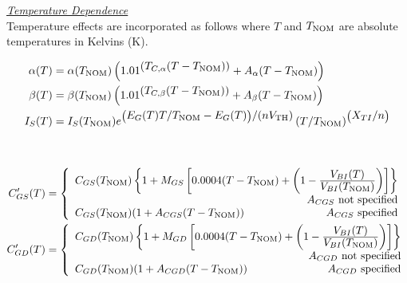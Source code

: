 \noindent\underline{\sl \large Temperature Dependence}
\\[0.1in]
Temperature effects are incorporated as follows where $T$ and $T_{\mbox{\scriptsize NOM}}$
are absolute temperatures in Kelvins (K).

\begin{align}
\alpha(T) & =  \alpha(T_{\mbox{\scriptsize NOM}}) \left(
                1.01^{\textstyle(T_{C,\alpha}(T-T_{\mbox{\scriptsize NOM}}))}
                + A_{\alpha}(T-T_{\mbox{\scriptsize NOM}}) \right)
                \\
\beta(T) & =  \beta(T_{\mbox{\scriptsize NOM}}) \left(
                1.01^{\textstyle(T_{C,\beta}(T-T_{\mbox{\scriptsize NOM}}))}
                + A_{\beta}(T-T_{\mbox{\scriptsize NOM}}) \right)
                \\
I_S (T) & =  I_S(T_{\mbox{\scriptsize NOM}})
        e^{\left( \textstyle E_G(T) {T / {T_{\mbox{\scriptsize NOM}}}}
            - E_G(T) \right) {\textstyle /(nV_{\mbox{\scriptsize TH}})}}
    \left({{\textstyle T} / {\textstyle T_{\mbox{\scriptsize NOM}}}}
    \right)^{ \left( \textstyle X_{TI}/n \right) }
\end{align}

~

\begin{align}
C'_{GS} (T)&= \left\{ \begin{array}{l}
       C_{GS}(T_{\ms{NOM}})
       \left\{1 + M_{GS} \left[0.0004(T-T_{\ms{NOM}})+\left(1-
   {{\textstyle V_{BI} (T)} \over {\textstyle V_{BI}(T_{\ms{NOM}})}}\right)
    \right]\right\} \nonumber\\
    \hspace*{\fill} A_{CGS} \mbox{ not specified} \\
       C_{GS}(T_{\ms{NOM}})(1 + A_{CGS}(T-T_{\ms{NOM}}))
    \hspace*{\fill} A_{CGS} \mbox{ specified} \\
      \end{array} \right. \\  %
C'_{GD} (T)&= \left\{ \begin{array}{l}
       C_{GD}(T_{\ms{NOM}})\left\{1 + M_{GD}
        \left[0.0004(T-T_{\ms{NOM}})+\left(1-
   {{\textstyle V_{BI} (T)} \over
    {\textstyle V_{BI}(T_{\ms{NOM}})}}\right) \right]\right\}\nonumber\\
    \hspace*{\fill} A_{CGD} \mbox{ not specified} \\
       C_{GD}(T_{\ms{NOM}})(1 + A_{CGD}(T-T_{\ms{NOM}}))
   \hspace*{\fill}  A_{CGD} \mbox{ specified} \\
      \end{array} \right. %
\end{align}

